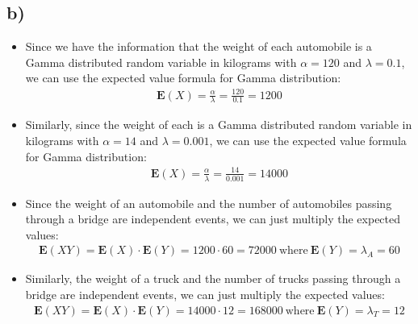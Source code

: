 \documentclass[12pt]{article}
\begin{document}
\subsection*{b)}
\begin{itemize}
    \item Since we have the information that the weight of each automobile is a Gamma distributed random variable in kilograms with $\alpha = 120$
    and $\lambda = 0.1$, we can use the expected value formula for Gamma distribution:
    \begin{equation*}
        \begin{split}
            \textbf{E}(X) = \frac{\alpha}{\lambda} = \frac{120}{0.1} = 1200 
        \end{split}
    \end{equation*}
    \item Similarly, since the weight of each is a Gamma distributed random variable in kilograms with $\alpha = 14$
    and $\lambda = 0.001$, we can use the expected value formula for Gamma distribution:
    \begin{equation*}
        \begin{split}
            \textbf{E}(X) = \frac{\alpha}{\lambda} = \frac{14}{0.001} = 14000
        \end{split}
    \end{equation*}
    \item Since the weight of an automobile and the number of automobiles passing through a bridge are independent events, we can just multiply the expected values:
    \begin{equation*}
        \begin{split}
            \textbf{E}(XY) = \textbf{E}(X) \cdot \textbf{E}(Y) = 1200 \cdot 60 = 72000 \ \text{where} \ \textbf{E}(Y) = \lambda_A = 60
        \end{split}
    \end{equation*}
    \item Similarly, the weight of a truck and the number of trucks passing through a bridge are independent events, we can just multiply the expected values:
    \begin{equation*}
        \begin{split}
            \textbf{E}(XY) = \textbf{E}(X) \cdot \textbf{E}(Y) = 14000 \cdot 12 = 168000 \ \text{where} \ \textbf{E}(Y) = \lambda_T = 12
        \end{split}
    \end{equation*}
\end{itemize}
\end{document}

